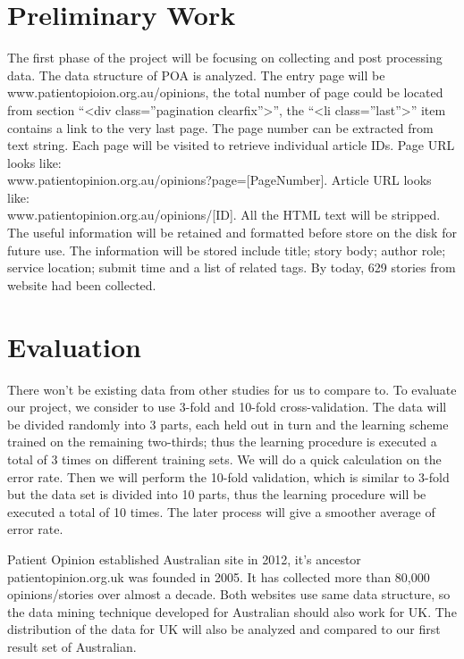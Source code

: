 \documentclass[10pt,twocolumn]{article}
\begin{document}
\section{Preliminary Work}
The first phase of the project will be focusing on collecting and post processing data. The data structure of POA is analyzed. The entry page will be www.patientopioion.org.au/opinions, the total number of page could be located from section “<div class=”pagination clearfix”>”, the “<li class=”last”>” item contains a link to the very last page. The page number can be extracted from text string. Each page will be visited to retrieve individual article IDs. 
Page URL looks like:\\ www.patientopinion.org.au/opinions?page=[PageNumber].
Article URL looks like:\\  www.patientopinion.org.au/opinions/[ID].
All the HTML text will be stripped. The useful information will be retained and formatted before store on the disk for future use. The information will be stored include title; story body; author role; service location; submit time and a list of related tags. By today, 629 stories from website had been collected.

\section{Evaluation}
There won’t be existing data from other studies for us to compare to. To evaluate our project, we consider to use 3-fold and 10-fold cross-validation. The data will be divided randomly into 3 parts, each held out in turn and the learning scheme trained on the remaining two-thirds; thus the learning procedure is executed a total of 3 times on different training sets. We will do a quick calculation on the error rate. Then we will perform the 10-fold validation, which is similar to 3-fold but the data set is divided into 10 parts, thus the learning procedure will be executed a total of 10 times. The later process will give a smoother average of error rate.

Patient Opinion established Australian site in 2012, it’s ancestor patientopinion.org.uk was founded in 2005. It has collected more than 80,000 opinions/stories over almost a decade. Both websites use same data structure, so the data mining technique developed for Australian should also work for UK. The distribution of the data for UK will also be analyzed and compared to our first result set of Australian.



\end{document}
